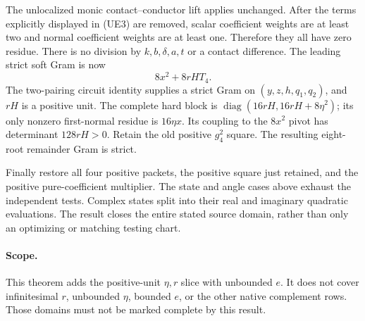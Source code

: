 The unlocalized monic contact--conductor lift applies unchanged.
After the terms explicitly displayed in (UE3) are removed, scalar
coefficient weights are at least two and normal coefficient weights
are at least one. Therefore they all have zero residue. There is no
division by $k,b,\delta,a,t$ or a contact difference. The leading
strict soft Gram is now
\[
                  8x^2+8rH T_4.
\]
The two-pairing circuit identity supplies a strict Gram on
$(y,z,h,q_1,q_2)$, and $rH$ is a positive unit. The complete hard
block is $\operatorname{diag}(16rH,16rH+8\eta^2)$; its only
nonzero first-normal residue is $16\eta x$. Its coupling to the
$8x^2$ pivot has determinant $128rH>0$. Retain the old positive
$g_4^2$ square. The resulting eight-root remainder Gram is strict.

Finally restore all four positive packets, the positive square just
retained, and the positive pure-coefficient multiplier. The state and
angle cases above exhaust the independent tests. Complex states split
into their real and imaginary quadratic evaluations. The result
closes the entire stated source domain, rather than only an optimizing
or matching testing chart.

\paragraph{Scope.}
This theorem adds the positive-unit $\eta,r$ slice with unbounded
$e$. It does not cover infinitesimal $r$, unbounded $\eta$, bounded
$e$, or the other native complement rows. Those domains must not be
marked complete by this result.
